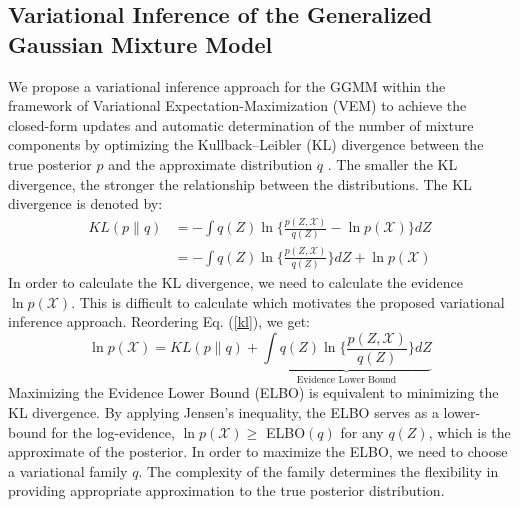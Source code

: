 \documentclass[conference]{IEEEtran}
\begin{document}
\subsection{Variational Inference of the Generalized Gaussian Mixture Model}

We propose a variational inference approach for the GGMM within the framework of Variational Expectation-Maximization (VEM) \cite{b10} \cite{Bishop} to achieve the closed-form updates and automatic determination of the number of mixture components by 
optimizing the Kullback–Leibler (KL) divergence between the true posterior $p$ and the approximate distribution $q$ \cite{Bishop}.
The smaller the KL divergence, the stronger the relationship between the distributions. The KL divergence is denoted by:
\begin{equation}
    \begin{split}\label{kl}
    KL(p\parallel q) & = - \int q(Z) \ln\{\frac{p(Z,\mathcal{X})}{q(Z)}-\ln p(\mathcal{X})\}dZ \\ &
    = - \int q(Z) \ln\{\frac{p(Z,\mathcal{X})}{q(Z)}\}dZ + \ln p(\mathcal{X})
    \end{split}
 \end{equation}
 In order to calculate the KL divergence, we need to calculate the evidence $\ln p(\mathcal{X})$. This is difficult to calculate which motivates the proposed variational inference approach.
 Reordering Eq. (\ref{kl}), we get: 
 \begin{equation}
    \ln p(\mathcal{X}) = KL(p\parallel q) + \underbrace{\int q(Z) \ln\{\frac{p(Z,\mathcal{X})}{q(Z)}\}dZ}_\text{Evidence Lower Bound}
 \end{equation}
Maximizing the Evidence Lower Bound (ELBO) is equivalent to minimizing the KL divergence. 
By applying Jensen's inequality, the ELBO serves as a lower-bound for the log-evidence, $\ln p(\mathcal{X}) \geq$ ELBO$(q)$ for any $q(Z)$, which is
the approximate of the posterior.  
In order to maximize the ELBO, we need to choose a variational family $q$.
The complexity of the family determines the flexibility in providing appropriate approximation to the true posterior distribution.
\end{document}
